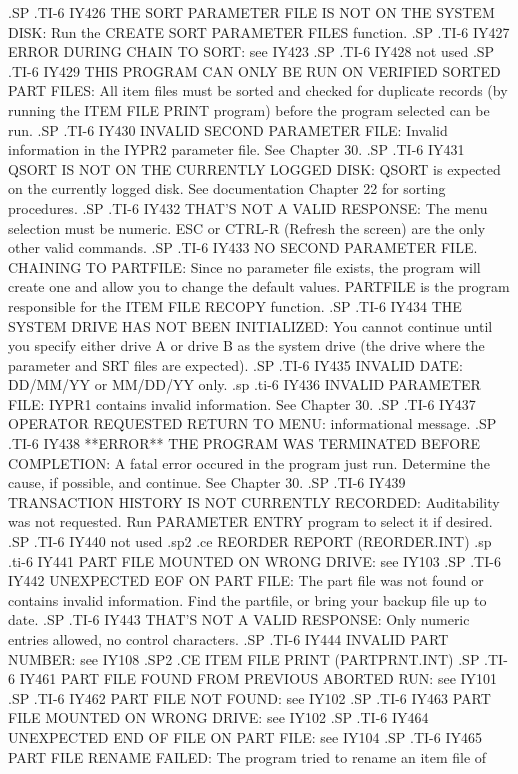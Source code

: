 .SP
.TI-6
IY426 THE SORT PARAMETER FILE IS NOT ON THE SYSTEM DISK: Run the CREATE SORT
PARAMETER FILES  function.
.SP
.TI-6
IY427 ERROR DURING CHAIN TO SORT: see IY423
.SP
.TI-6
IY428 not used
.SP
.TI-6
IY429 THIS PROGRAM CAN ONLY BE RUN ON VERIFIED SORTED PART FILES:  All item
files must be sorted and checked for duplicate records (by running the ITEM
FILE PRINT program) before the program
selected can be run.
.SP
.TI-6
IY430 INVALID SECOND PARAMETER FILE: Invalid information in the IYPR2
parameter file. See Chapter 30.
.SP
.TI-6
IY431 QSORT IS NOT ON THE CURRENTLY LOGGED DISK: QSORT	is expected on the
currently logged disk.	See documentation
Chapter 22 for sorting procedures.
.SP
.TI-6
IY432 THAT'S NOT A VALID RESPONSE: The menu selection must be numeric.
ESC or CTRL-R (Refresh the screen) are the only other valid commands.
.SP
.TI-6
IY433 NO SECOND PARAMETER FILE. CHAINING TO PARTFILE: Since no parameter
file exists, the program
will create one and allow you to change the default values.
PARTFILE is the program responsible for the ITEM FILE RECOPY function.
.SP
.TI-6
IY434 THE SYSTEM DRIVE HAS NOT BEEN INITIALIZED: You cannot continue until
you specify either drive A or drive B as the system drive (the drive where
the parameter and SRT files are expected).
.SP
.TI-6
IY435 INVALID DATE: DD/MM/YY or MM/DD/YY only.
.sp
.ti-6
IY436 INVALID PARAMETER FILE: IYPR1 contains invalid information. See
Chapter 30.
.SP
.TI-6
IY437 OPERATOR REQUESTED RETURN TO MENU: informational message.
.SP
.TI-6
IY438 **ERROR**  THE PROGRAM WAS TERMINATED BEFORE COMPLETION: A fatal error
occured in the program just run. Determine the cause,
if possible, and continue.  See Chapter 30.
.SP
.TI-6
IY439 TRANSACTION HISTORY IS NOT CURRENTLY RECORDED: Auditability was not
requested.  Run PARAMETER ENTRY program to select it if desired.
.SP
.TI-6
IY440 not used
.sp2
.ce
REORDER REPORT (REORDER.INT)
.sp
.ti-6
IY441 PART FILE MOUNTED ON WRONG DRIVE: see IY103
.SP
.TI-6
IY442 UNEXPECTED EOF ON PART FILE: The part file was not found or contains
invalid information.  Find the partfile, or bring your backup file up to date.
.SP
.TI-6
IY443 THAT'S NOT A VALID RESPONSE: Only numeric entries allowed, no control
characters.
.SP
.TI-6
IY444 INVALID PART NUMBER: see IY108
.SP2
.CE
ITEM FILE PRINT (PARTPRNT.INT)
.SP
.TI-6
IY461 PART FILE FOUND FROM PREVIOUS ABORTED RUN: see IY101
.SP
.TI-6
IY462 PART FILE NOT FOUND: see IY102
.SP
.TI-6
IY463 PART FILE MOUNTED ON WRONG DRIVE: see IY102
.SP
.TI-6
IY464 UNEXPECTED END OF FILE ON PART FILE: see IY104
.SP
.TI-6
IY465 PART FILE RENAME FAILED: The program tried to rename an item file of
